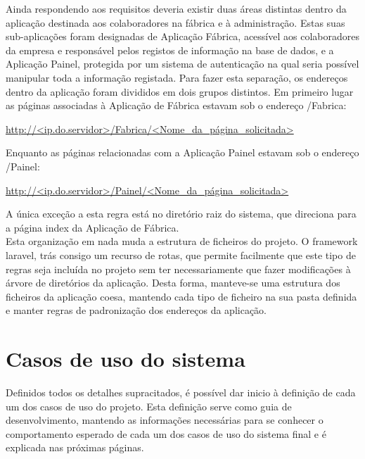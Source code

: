 \noindent 
Ainda respondendo aos requisitos deveria existir duas áreas distintas dentro da aplicação destinada aos colaboradores na fábrica e à administração.
Estas suas sub-aplicações foram designadas de Aplicação Fábrica, acessível aos colaboradores da empresa e responsável pelos registos de informação na base de dados, e a Aplicação Painel, protegida por um sistema de autenticação na qual seria possível manipular toda a informação registada.
Para fazer esta separação, os endereços dentro da aplicação foram divididos em dois grupos distintos. Em primeiro lugar as páginas associadas à Aplicação de Fábrica estavam sob o endereço /Fabrica:

\begin{center}
\url{http://<ip.do.servidor>/Fabrica/<Nome_da_página_solicitada>}
\end{center}

\noindent 
Enquanto as páginas relacionadas com a Aplicação Painel estavam sob o endereço /Painel:

\begin{center}
	\url{http://<ip.do.servidor>/Painel/<Nome_da_página_solicitada>}
\end{center}

\noindent 
A única exceção a esta regra está no diretório raiz do sistema, que direciona para a página index da Aplicação de Fábrica.\\
Esta organização em nada muda a estrutura de ficheiros do projeto. O framework laravel, trás consigo um recurso de rotas, que permite facilmente que este tipo de regras seja incluída no projeto sem ter necessariamente que fazer modificações à árvore de diretórios da aplicação. Desta forma, manteve-se uma estrutura dos ficheiros da aplicação coesa, mantendo cada tipo de ficheiro na sua pasta definida e manter regras de padronização dos endereços da aplicação.

\section{Casos de uso do sistema}
Definidos todos os detalhes supracitados, é possível dar inicio à definição de cada um dos casos de uso do projeto. Esta definição serve como guia de desenvolvimento, mantendo as informações necessárias para se conhecer o comportamento esperado de cada um dos casos de uso do sistema final e é explicada nas próximas páginas.
\newpage


\newpage

\newpage

\newpage

\newpage

\newpage

\newpage

\newpage

\newpage


